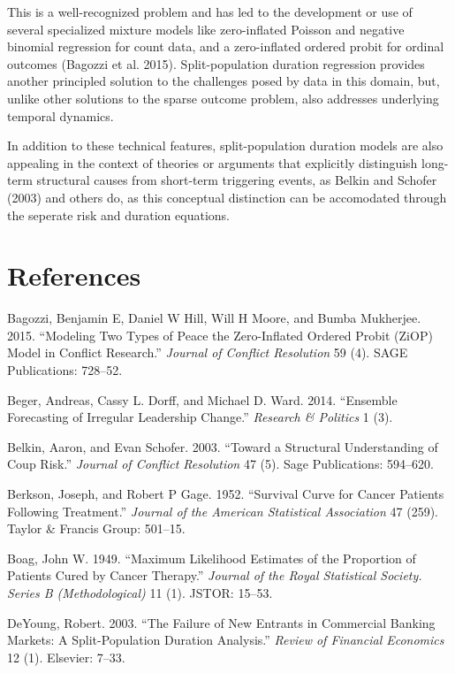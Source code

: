 \documentclass[]{article}
\begin{document}
This is a well-recognized problem and has led to the development or use
of several specialized mixture models like zero-inflated Poisson and
negative binomial regression for count data, and a zero-inflated ordered
probit for ordinal outcomes (Bagozzi et al. 2015). Split-population
duration regression provides another principled solution to the
challenges posed by data in this domain, but, unlike other solutions to
the sparse outcome problem, also addresses underlying temporal dynamics.

In addition to these technical features, split-population duration
models are also appealing in the context of theories or arguments that
explicitly distinguish long-term structural causes from short-term
triggering events, as Belkin and Schofer (2003) and others do, as this
conceptual distinction can be accomodated through the seperate risk and
duration equations.

\section*{References}\label{references}

Bagozzi, Benjamin E, Daniel W Hill, Will H Moore, and Bumba Mukherjee.
2015. ``Modeling Two Types of Peace the Zero-Inflated Ordered Probit
(ZiOP) Model in Conflict Research.'' \emph{Journal of Conflict
Resolution} 59 (4). SAGE Publications: 728--52.

Beger, Andreas, Cassy L. Dorff, and Michael D. Ward. 2014. ``Ensemble
Forecasting of Irregular Leadership Change.'' \emph{Research \&
Politics} 1 (3).

Belkin, Aaron, and Evan Schofer. 2003. ``Toward a Structural
Understanding of Coup Risk.'' \emph{Journal of Conflict Resolution} 47
(5). Sage Publications: 594--620.

Berkson, Joseph, and Robert P Gage. 1952. ``Survival Curve for Cancer
Patients Following Treatment.'' \emph{Journal of the American
Statistical Association} 47 (259). Taylor \& Francis Group: 501--15.

Boag, John W. 1949. ``Maximum Likelihood Estimates of the Proportion of
Patients Cured by Cancer Therapy.'' \emph{Journal of the Royal
Statistical Society. Series B (Methodological)} 11 (1). JSTOR: 15--53.

DeYoung, Robert. 2003. ``The Failure of New Entrants in Commercial
Banking Markets: A Split-Population Duration Analysis.'' \emph{Review of
Financial Economics} 12 (1). Elsevier: 7--33.
\end{document}
